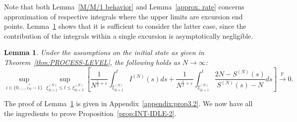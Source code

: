 \documentclass[11pt, reqno]{article}
\newtheorem{lemma}[theorem]{Lemma}
\numberwithin{equation}{section}
\numberwithin{theorem}{section}
\newcommand{\pto}{\ensuremath{\xrightarrow{\ \mathbb{P}\ }}}  %
\begin{document}
Note that both Lemma~\ref{M/M/1 behavior} and Lemma~\ref{approx. rate} concerns approximation of respective integrals where the upper limits are excursion end points.  
Lemma~\ref{each excursion behavior} shows that it is sufficient to consider the latter case, since the contribution of the integrals within a single excursion is asymptotically negligible.
\begin{lemma} \label{each excursion behavior}
Under the assumptions on the initial state as given in Theorem~\ref{thm:PROCESS-LEVEL}, the following holds as $N\to\infty$:
\begin{equation}
    \label{eq:lem-A4}
    \sup_{i\in \{0,...,i^*_N-1\}}\sup_{\xi^{(N)}_{2i+1}\leq t\leq \xi^{(N)}_{2i+3}}\left[\frac{1}{N^{\frac{1}{2}+\varepsilon}}\int_{\xi^{(N)}_{2i+1}}^t I^{(N)}(s)ds+\frac{1}{N^{\frac{1}{2}+\varepsilon}}\int_{\xi^{(N)}_{2i+1}}^t\frac{2N-S^{(N)}(s)}{S^{(N)}(s)-N}ds\right] \pto 0.
\end{equation}
\end{lemma}
The proof of Lemma~\ref{each excursion behavior} is given in Appendix~\ref{appendix:prop3.2}.
We now have all the ingredients to prove Proposition~\ref{prop:INT-IDLE-2}.
\end{document}
